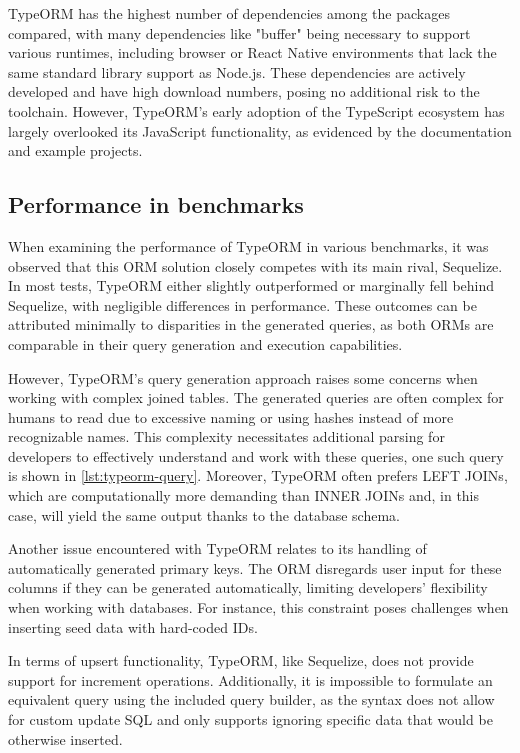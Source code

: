 TypeORM has the highest number of dependencies among the packages compared, with
many dependencies like "buffer" being necessary to support various runtimes,
including browser or React Native environments that lack the same standard
library support as Node.js. These dependencies are actively developed and have
high download numbers, posing no additional risk to the toolchain. However,
TypeORM's early adoption of the TypeScript ecosystem has largely overlooked its
JavaScript functionality, as evidenced by the documentation and example
projects.

\subsection*{Performance in benchmarks}

When examining the performance of TypeORM in various benchmarks, it was observed
that this ORM solution closely competes with its main rival, Sequelize. In most
tests, TypeORM either slightly outperformed or marginally fell behind Sequelize,
with negligible differences in performance. These outcomes can be attributed
minimally to disparities in the generated queries, as both ORMs are comparable
in their query generation and execution capabilities.

However, TypeORM's query generation approach raises some concerns when working
with complex joined tables. The generated queries are often complex for humans
to read due to excessive naming or using hashes instead of more recognizable
names. This complexity necessitates additional parsing for developers to
effectively understand and work with these queries, one such query is shown in
\autoref{lst:typeorm-query}. Moreover, TypeORM often prefers LEFT JOINs, which
are computationally more demanding than INNER JOINs and, in this case, will
yield the same output thanks to the database schema.

Another issue encountered with TypeORM relates to its handling of automatically
generated primary keys. The ORM disregards user input for these columns if they
can be generated automatically, limiting developers' flexibility when working
with databases. For instance, this constraint poses challenges when inserting
seed data with hard-coded IDs.

In terms of upsert functionality, TypeORM, like Sequelize, does not provide
support for increment operations. Additionally, it is impossible to formulate an
equivalent query using the included query builder, as the syntax does not allow
for custom update SQL and only supports ignoring specific data that would be
otherwise inserted.

